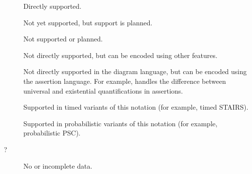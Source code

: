 \begin{description}
  \item[\OK] Directly supported.
  \item[\SOON] Not yet supported, but
  support is planned.
  \item[\NO] Not supported or planned.
  \item[\ISH] Not directly supported, but can be encoded using other
  features.
  \item[\ASST] Not directly supported in the
  diagram language, but can be encoded using the
  assertion language.  For example, \langname{} handles
  the difference between universal and existential
  quantifications in assertions.
  \item[\INTIMED] Supported in timed variants of this
  notation (for example, timed STAIRS).
  \item[\INPROB] Supported in
  probabilistic variants of this
  notation (for example, probabilistic PSC). 
  \item[?] No or incomplete data.
\end{description}

